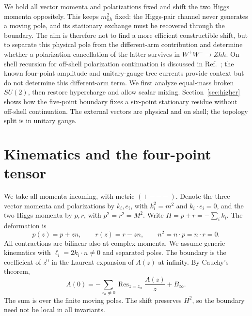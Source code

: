 \documentclass[11pt,a4paper]{article}
\begin{document}
We hold all vector momenta and polarizations fixed and shift the two
Higgs momenta oppositely. This keeps \(m_{hh}^2\) fixed: the Higgs-pair
channel never generates a moving pole, and its stationary exchange
must be recovered through the boundary. The aim is therefore not to
find a more efficient constructible shift, but to separate this
physical pole from the different-arm contribution and determine
whether a polarization cancellation of the latter survives in
\(W^+W^-\to Zhh\). On-shell recursion for off-shell polarization
continuation is discussed in Ref.~\cite{Ke}; the known four-point
amplitude \cite{Aoude,Bachu,Balkin} and unitary-gauge tree currents
\cite{Dai} provide context but do not determine this different-arm
term. We first analyze equal-mass broken \(SU(2)\), then restore
hypercharge and allow scalar mixing. Section~\ref{sec:higher}
shows how the five-point boundary fixes a six-point stationary
residue without off-shell continuation. The external vectors are
physical and on shell; the topology split is in unitary gauge.

\section{Kinematics and the four-point tensor}
We take all momenta incoming, with metric \((+---)\). Denote the
three vector momenta and polarizations by \(k_i,e_i\), with
\(k_i^2=m^2\) and \(k_i\cdot e_i=0\), and the two Higgs momenta by
\(p,r\), with \(p^2=r^2=M^2\). Write \(H=p+r=-\sum_i k_i\).
The deformation is
\begin{equation}
 p(z)=p+zn,\qquad r(z)=r-zn,\qquad
 n^2=n\cdot p=n\cdot r=0.                                    \label{eq:shift}
\end{equation}
All contractions are bilinear also at complex momenta. We assume
generic kinematics with \(\ell_i=2k_i\cdot n\ne0\) and separated poles.
The boundary is the coefficient of \(z^0\) in the Laurent expansion
of \(A(z)\) at infinity. By Cauchy's theorem,
\begin{equation}
 A(0)=-\sum_{z_\alpha\ne0}\operatorname{Res}_{z=z_\alpha}
                 \frac{A(z)}{z}+B_\infty .
 \label{eq:cauchy}
\end{equation}
The sum is over the finite moving poles. The shift preserves \(H^2\),
so the boundary need not be local in all invariants.
\end{document}
